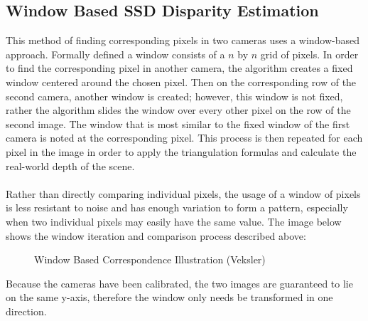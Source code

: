 \documentclass[11pt]{scrartcl}
\begin{document}
\subsection{Window Based SSD Disparity Estimation}
This method of finding corresponding pixels in two cameras uses a window-based approach. Formally defined a window consists of a $n$ by $n$ grid of pixels. In order to find the corresponding pixel in another camera, the algorithm creates a fixed window centered around the chosen pixel. 
Then on the corresponding row of the second camera, another window is created; however, 
this window is not fixed, rather the algorithm slides the window over every other pixel on the row of the second image. The window that is most similar to the fixed window of the first camera is noted at the corresponding pixel. This process is then repeated for each pixel in the image in order to apply the triangulation formulas and calculate the 
real-world depth of the scene. 
\\
\\
\newpage
Rather than directly comparing individual pixels, the usage of a window of pixels is less resistant to noise and has enough variation to form a pattern, especially when two individual pixels may easily have the same value. The image below shows the window iteration and comparison process described above:

\begin{figure}[!htb]
    \centering
    \caption{Window Based Correspondence Illustration (Veksler)}
\end{figure}


\begin{remark}
    Because the cameras have been calibrated, the two images are guaranteed to lie 
    on the same y-axis, therefore the window only needs be transformed in one 
    direction. 
\end{remark}
\\
\end{document}

